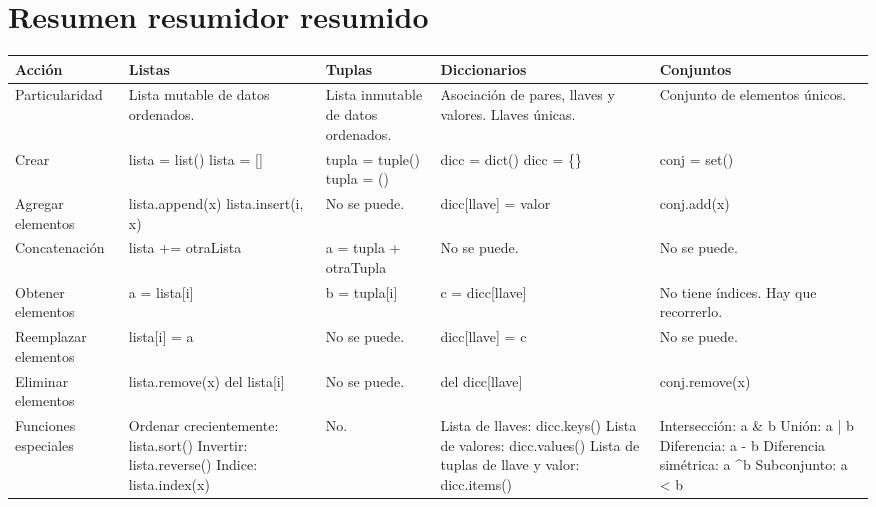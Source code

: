 \section*{Resumen resumidor resumido}

\begin{center}
	\begin{tabular}{|A{3cm}|S{3cm}|S{3cm}|S{3cm}|S{3cm}|}
	\hline
	Acción & Listas & Tuplas & Diccionarios & Conjuntos \\
	\hline
	Particularidad & Lista mutable de datos ordenados. & Lista inmutable de datos ordenados. & Asociación de pares, llaves y valores. \newline Llaves únicas. & Conjunto de elementos únicos. \\
	\hline
	Crear & lista = list() \newline lista = [] & tupla = tuple() \newline tupla = () & dicc = dict() \newline dicc = \{\} & conj = set() \\
	\hline
	Agregar elementos & lista.append(x) \newline lista.insert(i, x) & No se puede. & dicc[llave] = valor & conj.add(x) \\
	\hline
	Concatenación & lista += otraLista & a = tupla + otraTupla & No se puede. & No se puede. \\
	\hline
	Obtener elementos & a = lista[i] & b = tupla[i] & c = dicc[llave] & No tiene índices. \newline Hay que recorrerlo. \\
	\hline
	Reemplazar elementos & lista[i] = a & No se puede. & dicc[llave] = c & No se puede. \\
	\hline
	Eliminar elementos & lista.remove(x) \newline del lista[i] & No se puede. & del dicc[llave] & conj.remove(x) \\
	\hline
	Funciones especiales & Ordenar crecientemente: lista.sort() \newline Invertir:  lista.reverse() \newline Indice: lista.index(x) & No. & Lista de llaves: dicc.keys() \newline Lista de valores:  dicc.values() \newline Lista de tuplas de llave y valor: dicc.items() & Intersección: a \& b \newline Unión: a | b \newline Diferencia: a - b \newline Diferencia simétrica: a \textasciicircum b \newline Subconjunto: a < b \\
	\hline
	\end{tabular}
\end{center}

\newpage